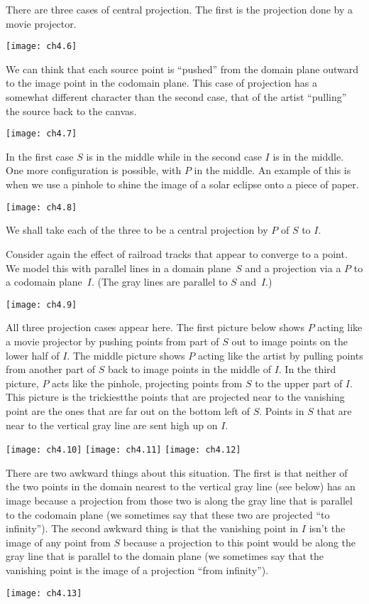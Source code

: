 There are three cases of central projection.
The first is the projection done by a movie projector.
\begin{center}
  \texttt{[image: ch4.6]}
\end{center}
We can think that each source point is ``pushed'' from the domain plane 
outward to the image point in the codomain plane.
This case of projection has a somewhat different character than 
the second case, that of the artist
``pulling'' the source back to the canvas.
\begin{center}
  \texttt{[image: ch4.7]}
\end{center}
In the first case $S$ is in the middle
while in the second case $I$ is in the middle.
One more configuration is possible, with $P$ in the middle. 
An example of this is when we use a pinhole to shine the 
image of a solar eclipse onto a piece of paper.
\begin{center}
  \texttt{[image: ch4.8]}
\end{center}
We shall take each of the three to be a central projection by $P$ of
$S$ to $I$.

Consider again the effect of railroad tracks  
that appear to converge to a point.
We model this with parallel lines in a domain plane~$S$
and a projection via a $P$ to a codomain plane~$I$. 
(The gray lines are parallel to $S$ and~$I$.)
\begin{center}
  \texttt{[image: ch4.9]}
\end{center}
All three projection cases appear here.
The first picture below shows $P$ acting like a movie projector by pushing
points from part of $S$ out to image points on the lower half of $I$.
The middle picture shows $P$ acting like the artist by 
pulling points from another part of $S$ back to  
image points in the middle of $I$.
In the third picture, $P$ acts like the pinhole, projecting points from $S$
to the upper part of $I$.
This picture is the trickiest\Dash the points that are
projected near to the vanishing point are the ones that are 
far out on the bottom left of $S$. 
Points in $S$ that are near to the vertical gray line
are sent high up on $I$.
\begin{center}
  \texttt{[image: ch4.10]}
\hfil
  \texttt{[image: ch4.11]}
\hfil
  \texttt{[image: ch4.12]}
\end{center}
There are two awkward things about this situation.
The first is that neither of the two points in the domain
nearest to the vertical gray line (see below) has an image 
because a projection from those two is along the
gray line that is parallel to the codomain plane
(we sometimes say that these two are projected ``to infinity'').
The second awkward thing is that 
the vanishing point in $I$
isn't the image of any point from $S$ 
because a projection to this point would be along the gray line
that is parallel to the domain plane
(we sometimes say that the vanishing point is the image of a projection 
``from infinity'').
\begin{center}
  \texttt{[image: ch4.13]}
\end{center}

